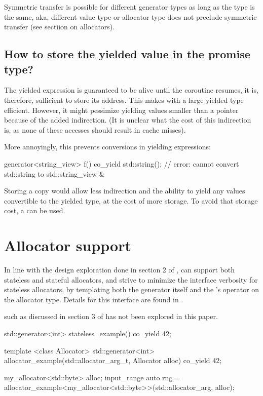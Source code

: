 \documentclass{wg21}
\begin{document}
Symmetric transfer is possible for different generator types as long as the  type is the same, aka,
different value type or allocator type does not preclude symmetric transfer (see sectiion on allocators).

\subsection{How to store the yielded value in the promise type?}

The yielded expression is guaranteed to be alive until the coroutine resumes, it is, therefore, sufficient to store
its address. 
This makes  with a large yielded type efficient.
However, it might pessimize yielding values smaller than a pointer because of the added indirection.
(It is unclear what the cost of this indirection is, as none of these accesses should result in cache misses).

More annoyingly, this prevents conversions in yielding expressions:

\begin{colorblock}
    generator<string_view> f() {
        co_yield std::string(); // error: cannot convert std::string to std::string_view \&
    }
\end{colorblock}

Storing a copy would allow less indirection and the ability to yield any values convertible to the yielded type,
at the cost of more storage.
To avoid that storage cost, a  can be used.


\section{Allocator support}

In line with the design exploration done in section 2 of ,  can support both stateless and stateful allocators, and strive
to minimize the interface verbosity for stateless allocators, by templating both the generator itself and the 's  operator
on the allocator type. Details for this interface are found in .

 such as discussed in section 3 of  has not been explored in this paper.

\begin{colorblock}
    std::generator<int> stateless_example() {
        co_yield 42;
    }
    
    template <class Allocator>
    std::generator<int> 
    allocator_example(std::allocator_arg_t, Allocator alloc) {
        co_yield 42;
    }
    
    my_allocator<std::byte> alloc;
    input_range auto rng = allocator_example<my_allocator<std::byte>>(std::allocator_arg, alloc);
    
\end{colorblock}
\end{document}
